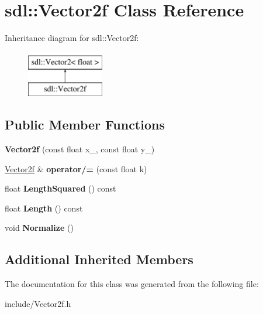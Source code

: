 \hypertarget{classsdl_1_1Vector2f}{\section{sdl\-:\-:Vector2f Class Reference}
\label{classsdl_1_1Vector2f}
}
Inheritance diagram for sdl\-:\-:Vector2f\-:\begin{figure}[H]
\begin{center}
\leavevmode
\includegraphics[height=2.000000cm]{classsdl_1_1Vector2f}
\end{center}
\end{figure}
\subsection*{Public Member Functions}
\begin{DoxyCompactItemize}
\item 
\hypertarget{classsdl_1_1Vector2f_ae789e521778c03e030d83f6076e50be9}{{\bfseries Vector2f} (const float x\-\_\-, const float y\-\_\-)}\label{classsdl_1_1Vector2f_ae789e521778c03e030d83f6076e50be9}

\item 
\hypertarget{classsdl_1_1Vector2f_a80edfede98ea588814a56c7fbb620a68}{\hyperlink{classsdl_1_1Vector2f}{Vector2f} \& {\bfseries operator/=} (const float k)}\label{classsdl_1_1Vector2f_a80edfede98ea588814a56c7fbb620a68}

\item 
\hypertarget{classsdl_1_1Vector2f_a03c6d398154d06f9f5a5c932852a0ff6}{float {\bfseries Length\-Squared} () const }\label{classsdl_1_1Vector2f_a03c6d398154d06f9f5a5c932852a0ff6}

\item 
\hypertarget{classsdl_1_1Vector2f_a768905e6443b054a5ab34678f9228502}{float {\bfseries Length} () const }\label{classsdl_1_1Vector2f_a768905e6443b054a5ab34678f9228502}

\item 
\hypertarget{classsdl_1_1Vector2f_ac3cf1bea3e4ae0a385c472e49019e992}{void {\bfseries Normalize} ()}\label{classsdl_1_1Vector2f_ac3cf1bea3e4ae0a385c472e49019e992}

\end{DoxyCompactItemize}
\subsection*{Additional Inherited Members}


The documentation for this class was generated from the following file\-:\begin{DoxyCompactItemize}
\item 
include/Vector2f.\-h\end{DoxyCompactItemize}
